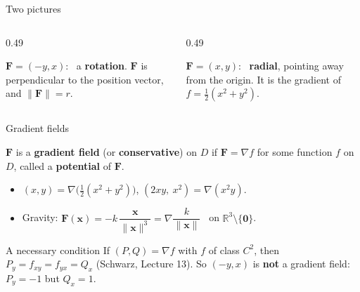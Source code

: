 \documentclass[10pt]{wosm-slides}
\newcommand{\R}{\mathbb{R}}
\newcommand{\norm}[1]{\lVert #1 \rVert}
\newcommand{\vx}{\mathbf{x}}
\newcommand{\vF}{\mathbf{F}}
\begin{document}
\begin{frame}{Two pictures}
  \begin{columns}[t]
    \begin{column}{0.49\textwidth}
      \centering
      \par\small $\vF = (-y, x)$: \ a \textbf{rotation}. $\vF$ is perpendicular to the position vector,
      and $\norm{\vF} = r$.
    \end{column}
    \begin{column}{0.49\textwidth}
      \centering
      \par\small $\vF = (x, y)$: \ \textbf{radial}, pointing away from the origin. It is the gradient of
      $f = \frac12 (x^2 + y^2)$.
    \end{column}
  \end{columns}
\end{frame}

\begin{frame}{Gradient fields}
  \begin{definition}
    $\vF$ is a \textbf{gradient field} (or \textbf{conservative}) on $D$ if $\vF = \nabla f$ for some
    function $f$ on $D$, called a \textbf{potential} of $\vF$.
  \end{definition}
  \pause
  \begin{itemize}
    \item $(x, y) = \nabla\bigl(\frac12 (x^2 + y^2)\bigr)$, \quad $(2xy, \ x^2) = \nabla(x^2 y)$.
    \item Gravity: $\vF(\vx) = -k\, \dfrac{\vx}{\norm{\vx}^3} = \nabla \dfrac{k}{\norm{\vx}}$ \ on $\R^3 \setminus \{\mathbf 0\}$.
  \end{itemize}
  \pause
  \begin{block}{A necessary condition}
    If $(P, Q) = \nabla f$ with $f$ of class $C^2$, then $P_y = f_{xy} = f_{yx} = Q_x$ (Schwarz, Lecture 13).
    So $(-y, x)$ is \textbf{not} a gradient field: $P_y = -1$ but $Q_x = 1$.
  \end{block}
\end{frame}
\end{document}
